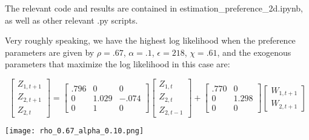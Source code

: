 \documentclass[12pt]{article}
\theoremstyle{definition}
\theoremstyle{remark}
\begin{document}
The relevant code and results are contained in estimation\_preference\_2d.ipynb, as well as other relevant .py scripts.

Very roughly speaking, we have the highest log likelihood when the preference parameters are given by $\rho = .67$, $\alpha = .1$, $\epsilon = 218$, $\chi = .61$, and the exogenous parameters that maximize the log likelihood in this case are:

\begin{equation*}
\begin{bmatrix}Z_{1,t+1}\\Z_{2,t+1}\\Z_{2,t}\end{bmatrix} = \begin{bmatrix}.796 & 0 & 0 \\0 & 1.029 & -.074\\ 0 & 1 & 0\end{bmatrix} \begin{bmatrix}Z_{1,t}\\Z_{2,t}\\Z_{2,t-1}\end{bmatrix} + \begin{bmatrix}.770 & 0 \\0 & 1.298 \\ 0 & 0\end{bmatrix} \begin{bmatrix} W_{1,t+1}\\ W_{2,t+1}\end{bmatrix}
\end{equation*}

\begin{center}
	\texttt{[image: rho\_0.67\_alpha\_0.10.png]}
\end{center}
\end{document}
